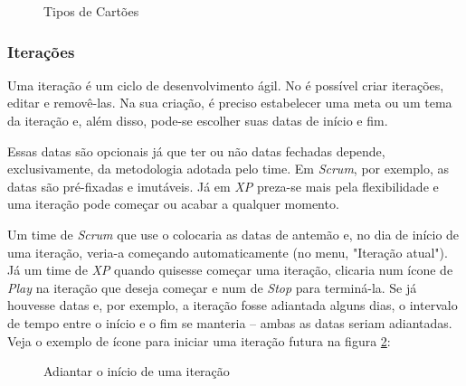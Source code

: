 \begin{figure}[H]
  \centering
  \caption{Tipos de Cartões}\label{figura:tipo_cartao}
\end{figure}

\subsubsection*{Iterações}

Uma iteração é um ciclo de desenvolvimento ágil. No \calopsita{} é possível criar iterações, editar e removê-las. Na sua criação, é preciso estabelecer uma meta ou um tema da iteração e, além disso, pode-se escolher suas datas de início e fim.

Essas datas são opcionais já que ter ou não datas fechadas depende, exclusivamente, da metodologia adotada pelo time. Em \textit{Scrum}, por exemplo, as datas são pré-fixadas e imutáveis. Já em \textit{XP} preza-se mais pela flexibilidade e uma iteração pode começar ou acabar a qualquer momento.

Um time de \textit{Scrum} que use o \calopsita{} colocaria as datas de antemão e, no dia de início de uma iteração, veria-a começando automaticamente (no menu, "Iteração atual"). Já um time de \textit{XP} quando quisesse começar uma iteração, clicaria num ícone de \textit{Play} na iteração que deseja começar e num de \textit{Stop} para terminá-la. Se já houvesse datas e, por exemplo, a iteração fosse adiantada alguns dias, o intervalo de tempo entre o início e o fim se manteria -- ambas as datas seriam adiantadas. Veja o exemplo de ícone para iniciar uma iteração futura na figura \ref{figura:play}:

\begin{figure}[H]
  \centering
  \caption{Adiantar o início de uma iteração}\label{figura:play}
\end{figure}

